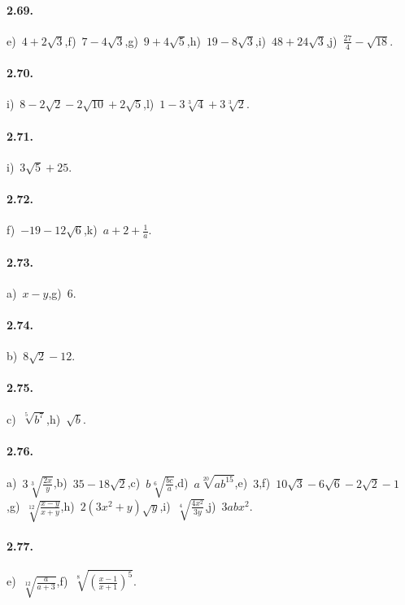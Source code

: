 \paragraph{2.69.}
e)~$4+2\sqrt 3$,\quad f)~$7-4\sqrt 3$,\quad g)~$9+4\sqrt 5$,\quad h)~$19-8\sqrt 3$,\quad i)~$48+24\sqrt 3$,\quad j)~$\frac{27} 4-\sqrt{18}$.

\paragraph{2.70.}
i)~$8-2\sqrt 2-2\sqrt{10}+2\sqrt 5$,\quad l)~$1-3\sqrt[3]4+3\sqrt[3]2$.

\paragraph{2.71.}
i)~$3\sqrt 5+25$.

\paragraph{2.72.}
f)~$-19-12\sqrt 6$,\quad k)~$a+2+\frac 1 a$.

\paragraph{2.73.}
a)~$x-y$,\quad g)~$6$.

\paragraph{2.74.}
b)~$8\sqrt{2}-12$.

\paragraph{2.75.}
c)~$\sqrt[5]{b^7}$,\quad h)~$\sqrt b$.

\paragraph{2.76.}
a)~$3\sqrt[3]{\frac{2x}{y}}$,\quad b)~$35-18\sqrt{2}$,\quad c)~$b\sqrt[6]{\frac{bc}{a}}$,\quad d)~$a\sqrt[20]{ab^{15}}$,\quad e)~$3$,\quad f)~$10\sqrt{3}-6\sqrt{6}-2\sqrt{2}-1$,\quad g)~$\sqrt[12]{\frac{x-y}{x+y}}$,\quad h)~$2(3x^2+y)\sqrt{y}$,\quad i)~$\sqrt[4]{\frac{4x^2}{3y}}$,\quad j)~$3abx^2$.

\paragraph{2.77.}
e)~$\sqrt[12]{\frac a{a+3}}$,\quad f)~$\sqrt[8]{\left(\frac{x-1}{x+1}\right)^5}$.

